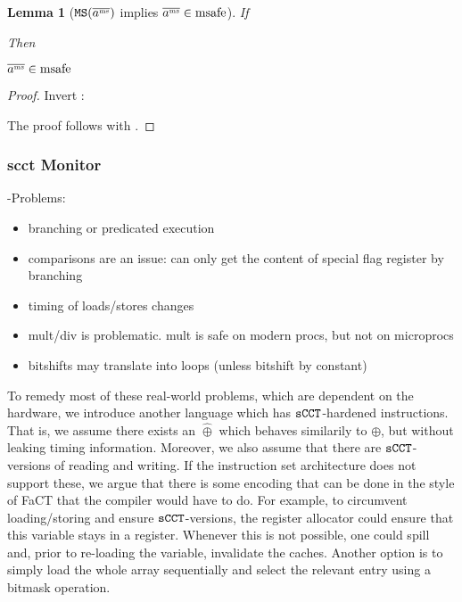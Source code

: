 \documentclass[a4paper,names,dvipsnames]{article}
\newtheorem{lemma}{Lemma}
\begin{document}
\begin{lemma}[$\texttt{MS}(\overline{a^{\text{\tiny ms}}})$ implies $\overline{a^{\text{\tiny ms}}}\in\operatorname{msafe}$]\label{lem:mssafe-tracems}
  If
  Then
  \begin{goals}
    \item $\overline{a^{\text{\tiny ms}}}\in\operatorname{msafe}$
  \end{goals}
\end{lemma}
\begin{proof}
  Invert :
  The proof follows with .
\end{proof}

\subsubsection{\gls*{scct} Monitor}
\sCCT-Problems:
\begin{itemize}
  \item branching or predicated execution
  \item comparisons are an issue: can only get the content of special flag register by branching
  \item timing of loads/stores changes
  \item mult/div is problematic. mult is safe on modern procs, but not on microprocs
  \item bitshifts may translate into loops (unless bitshift by constant)
\end{itemize}

To remedy most of these real-world problems, which are dependent on the hardware, we introduce another language which has $\texttt{sCCT}$-hardened instructions.
That is, we assume there exists an $\hat{\oplus}$ which behaves similarily to $\oplus$, but without leaking timing information.
Moreover, we also assume that there are $\texttt{sCCT}$-versions of reading and writing.
If the instruction set architecture does not support these, we argue that there is some encoding that can be done in the style of FaCT that the compiler would have to do.
For example, to circumvent loading/storing and ensure $\texttt{sCCT}$-versions, the register allocator could ensure that this variable stays in a register. Whenever this is not possible, one could spill and, prior to re-loading the variable, invalidate the caches. Another option is to simply load the whole array sequentially and select the relevant entry using a bitmask operation.
\end{document}
